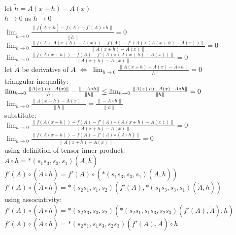 \documentclass[8pt]{extarticle}
\begin{document}
\begin{multicols*}{2}
  let $\tilde{h} = A(x+h) - A(x)$\\
  $\tilde{h} \rightarrow 0$ as $h \rightarrow 0$\\

  $\lim_{\tilde{h} \rightarrow 0} \frac{\| f(A+\tilde{h}) - f(A) - f'(A) \circ \tilde{h} \|}{\| \tilde{h} \|} = 0$\\
  $\lim_{h \rightarrow 0} \frac{\| f(A + A(x+h) - A(x)) - f(A) - f'(A) \circ (A(x+h) - A(x)) \|}{\| A(x+h) - A(x) \|} = 0$\\
  $\lim_{h \rightarrow 0} \frac{\| f(A(x+h)) - f(A) - f'(A) \circ (A(x+h) - A(x)) \|}{\| A(x+h) - A(x) \|} = 0$\\

  let $\dot{A}$ be derivative of $A$ $\iff$ $\lim_{h\rightarrow 0} \frac{\| A(x+h) - A(x) - \dot{A} \circ h\|}{\| h \|} = 0$\\
  triangular inequality:\\
  $\lim_{h\rightarrow 0} \frac{\| A(x+h) - A(x) \|}{\| h \|} - \frac{\| - \dot{A} \circ h\|}{\| h \|} \\
  \leq \lim_{h\rightarrow 0} \frac{\| A(x+h) - A(x) - \dot{A} \circ h\|}{\| h \|} = 0$\\

  $\lim_{h\rightarrow 0} \frac{\| A(x+h) - A(x)\|}{\| h \|} = \frac{\| - \dot{A} \circ h \|}{\| h \|}$\\

  substitute:\\
  $\lim_{h \rightarrow 0} \frac{\| f(A(x+h)) - f(A) - f'(A) \circ (A(x+h) - A(x)) \|}{\| A(x+h) - A(x) \|} = 0$\\
  $\lim_{h \rightarrow 0} \frac{\| f(A(x+h)) - f(A) - f'(A) \circ (\dot{A} \circ h) \|}{\| A(x+h) - A(x) \|} = 0$\\

  using definition of tensor inner product:\\
  $\dot{A} \circ h = *(s_1 s_3, s_3, s_1)(\dot{A}, h)$\\
  $f'(A) \circ (\dot{A} \circ h) = f'(A) \circ (*(s_1 s_3, s_3, s_1)(\dot{A}, h))$\\
  $f'(A) \circ (\dot{A} \circ h) = *(s_2 s_1, s_1, s_2)(f'(A), *(s_1 s_3, s_3, s_1)(\dot{A}, h))$\\

  using associativity:\\
  $f'(A) \circ (\dot{A} \circ h) = *(s_2 s_3, s_3, s_2)(*(s_2 s_1, s_1 s_3, s_2 s_3)(f'(A), \dot{A}), h)$\\
  $f'(A) \circ (\dot{A} \circ h) = *(s_2 s_1, s_1 s_3, s_2 s_3)(f'(A), \dot{A}) \circ h$\\


\end{multicols*}
\end{document}
